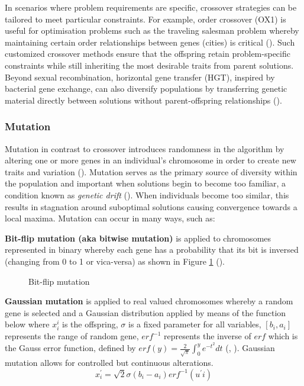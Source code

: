 \parbreak\noindent In scenarios where problem requirements are specific, crossover strategies can be tailored to meet particular constraints. For example, order crossover (OX1) is useful for optimisation problems such as the traveling salesman problem whereby maintaining certain order relationships between genes (cities) is critical (\cite{tsp}). Such customized crossover methods ensure that the offspring retain problem-specific constraints while still inheriting the most desirable traits from parent solutions. Beyond sexual recombination, horizontal gene transfer (HGT), inspired by bacterial gene exchange, can also diversify populations by transferring genetic material directly between solutions without parent-offspring relationships (\cite{hgt}).

\subsubsection{Mutation}\label{sec:ea_mutation}
Mutation in contrast to crossover introduces randomness in the algorithm by altering one or more genes in an individual's chromosome in order to create new traits and variation (\cite{evolutionaryComputingAndNeuralNetworks}). Mutation serves as the primary source of diversity within the population and important when solutions begin to become too familiar, a condition known as \textit{genetic drift} (\cite{advancesInEvolutionaryAlgorithms}). When individuals become too similar, this results in stagnation around suboptimal solutions causing convergence towards a local maxima. Mutation can occur in many ways, such as:

\parbreak\noindent \textbf{Bit-flip mutation (aka bitwise mutation)} is applied to chromosomes represented in binary whereby each gene has a probability that its bit is inversed (changing from 0 to 1 or vica-versa) as shown in Figure \ref{fig:bitflip} (\cite{intelligentOptimization}).
	
\parbreak
\begin{figure}[H] %
	\centering %
	\caption{Bit-flip mutation}
	\label{fig:bitflip} %
\end{figure}

\parbreak\noindent \textbf{Gaussian mutation} is applied to real valued chromosomes whereby a random gene is selected and a Gaussian distribution applied by means of the function below where $x_{i}^{i}$ is the offspring, $\sigma$ is a fixed parameter for all variables, $[b_{i}, a_{i}]$ represents the range of random gene, $erf^{-1}$ represents the inverse of $erf$ which is the Gauss error function, defined by $erf(y) = \frac{2}{\sqrt{\pi}}\int^{y}_{0}e^{-t^2}dt$ (\cite{bell2022applicationsgaussianmutationself}, \cite{gaussianMutation}). Gaussian mutation allows for controlled but continuous alterations.
\begin{equation}
	x_{i}^{'} = \sqrt{2} \sigma(b_{i} - a_{i}) erf^{-1}(u^{'}i)
\end{equation}

